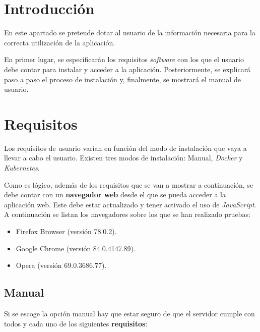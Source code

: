 
\section{Introducción}

En este apartado se pretende dotar al usuario de la información
necesaria para la correcta utilización de la aplicación. 

En primer lugar, se especificarán los requisitos \emph{software} con los que el
usuario debe contar para instalar y acceder a la aplicación. Posteriormente, se
explicará paso a paso el proceso de instalación y, finalmente, se
mostrará el manual de usuario.


\section{Requisitos}
Los requisitos de usuario varían en función del modo de instalación que 
vaya a llevar a cabo el usuario. Existen tres modos de instalación:
Manual, \emph{Docker} y \emph{Kubernetes}.

Como es lógico, además de los requisitos que se van a mostrar a
continuación, se debe contar con un \textbf{navegador web} desde el que
se pueda acceder a la aplicación web. Este debe estar actualizado y 
tener activado el uso de \emph{JavaScript}. A continuación se listan
los navegadores sobre los que se han realizado pruebas:

\begin{itemize}
\tightlist
\item
  Firefox Browser (versión 78.0.2).
\item
  Google Chrome (versión 84.0.4147.89).
\item
  Opera (versión 69.0.3686.77).
\end{itemize}

\subsection{Manual}

Si se escoge la opción manual hay que estar seguro de que el servidor
cumple con todos y cada uno de los siguientes \textbf{requisitos}:

